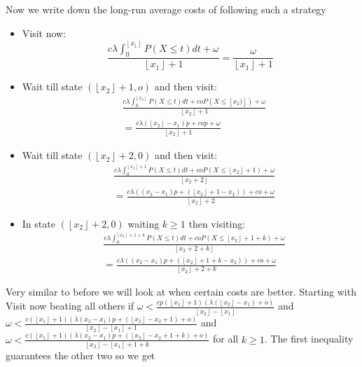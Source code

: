 \documentclass[a4paper,10pt]{article}
\newcommand{\floor}[1]{\left \lfloor #1 \right \rfloor}
\theoremstyle{definition}
\theoremstyle{definition}
\theoremstyle{remark}
\theoremstyle{definition}
\begin{document}
Now we write down the long-run average costs of following such a strategy
\begin{itemize}
\item Visit now:
\begin{equation}
\frac{c \lambda \int_{0}^{\floor{x_{1}}} P(X \leq t)dt +\omega}{\floor{x_{1}}+1}
=\frac{\omega}{\floor{x_{1}}+1}
\end{equation}
\item Wait till state $(\floor{x_{2}}+1,o)$ and then visit:
\begin{align}
&\frac{c \lambda \int_{0}^{\floor{x_{2}}} P(X \leq t)dt + coP(X \leq \floor{x_{2})})+\omega}{\floor{x_{2}}+1} \nonumber \\&=\frac{c \lambda (\floor{x_{2}}-x_{1})p +cop + \omega}{\floor{x_{2}}+1}
\end{align}


\item Wait till state $(\floor{x_{2}}+2,0)$ and then visit:
\begin{align}
&\frac{c \lambda \int_{0}^{\floor{x_{2}}+1} P(X \leq t)dt +coP(X \leq \floor{x_{2}}+1)+\omega}{\floor{x_{2}+2}} \nonumber \\ &=\frac{c \lambda ((x_{2}-x_{1})p + (\floor{x_{2}}+1-x_{2}))+co+\omega}{\floor{x_{2}}+2}
\end{align}

\item In state $(\floor{x_{2}}+2,0)$ waiting $k \geq 1$ then visiting:
\begin{align}
&\frac{c \lambda \int_{0}^{\floor{x_{2}}+1+k} P(X \leq t)dt +coP(X \leq \floor{x_{2}}+1+k)+\omega}{\floor{x_{2}+2+k}} \nonumber \\ &=\frac{c \lambda ((x_{2}-x_{1})p + (\floor{x_{2}}+1+k-x_{2}))+co+\omega}{\floor{x_{2}}+2+k}
\end{align}

\end{itemize}


Very similar to before we will look at when certain costs are better. Starting with Visit now beating all others if $ \omega < \frac{cp(\floor{x_{1}}+1)(\lambda (\floor{x_{2}}-x_{1})+o)}{\floor{x_{2}}-\floor{x_{1}}}$ and $\omega < \frac{c(\floor{x_{1}}+1)(\lambda (x_{2}-x_{1})p + (\floor{x_{2}}-x_{2}+1)+o)}{\floor{x_{2}}-\floor{x_{1}}+1}$ and $\omega < \frac{c(\floor{x_{1}}+1)(\lambda (x_{2}-x_{1})p + (\floor{x_{2}}-x_{2}+1+k)+o)}{\floor{x_{2}}-\floor{x_{1}}+1+k}$ for all $k \geq 1$. The first inequality guarantees the other two so we get
\end{document}
